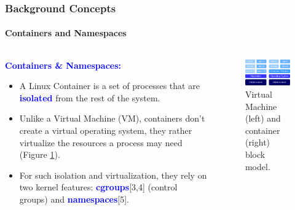 \documentclass[9pt,    %
    english,            %
    xcolor=table,       %
    envcountsect,        %
    aspectratio=169     %
]{beamer}
\begin{document}
\begin{frame}
    \frametitle{Background Concepts}
    \framesubtitle{Containers and Namespaces}

    \vspace{-25pt}

    \begin{columns}[t]
        \begin{column}{.55\textwidth}
            \textbf{\textcolor{blue}{Containers \& Namespaces:}}
            \begin{itemize}
                \item A Linux Container is a set of processes that are \textbf{\textcolor{blue}{isolated}} from the rest of the system.
                \item Unlike a Virtual Machine (VM), containers don't create a virtual operating system, they rather virtualize the resources a process may need (Figure \ref{fig:differences}).
                \item For such isolation and virtualization, they rely on two kernel features: \textbf{\textcolor{blue}{cgroups}}[3,4] (control groups) and \textbf{\textcolor{blue}{namespaces}}[5].
            \end{itemize}
        \end{column}
        \begin{column}{.35\textwidth}
            \begin{figure}[h!]
                \includegraphics[width=\textwidth]{./images/vm_vs_container.png}
                \caption{Virtual Machine (left) and container (right) block model.\label{fig:differences}}
            \end{figure}
        \end{column}
    \end{columns}
\end{frame}
\end{document}

